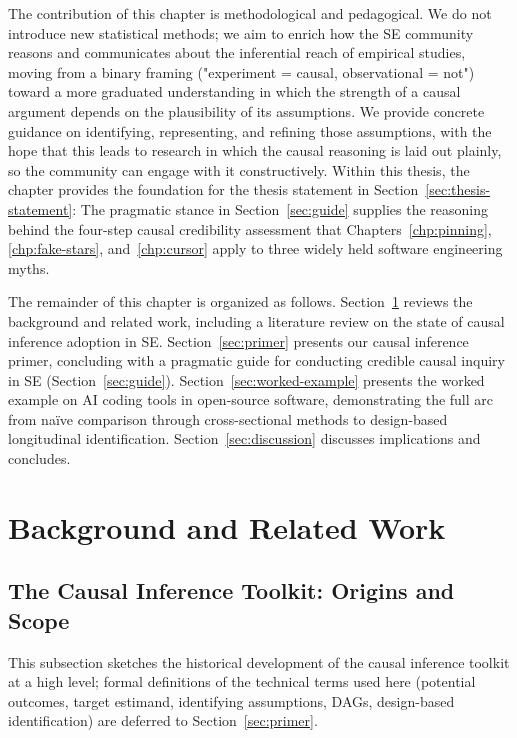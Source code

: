The contribution of this chapter is methodological and pedagogical. 
We do not introduce new statistical methods; we aim to enrich how the SE community reasons and communicates about the inferential reach of empirical studies, moving from a binary framing ("experiment = causal, observational = not") toward a more graduated understanding in which the strength of a causal argument depends on the plausibility of its assumptions. 
We provide concrete guidance on identifying, representing, and refining those assumptions, with the hope that this leads to research in which the causal reasoning is laid out plainly, so the community can engage with it constructively.
Within this thesis, the chapter provides the foundation for the thesis statement in Section~\ref{sec:thesis-statement}: The pragmatic stance in Section~\ref{sec:guide} supplies the reasoning behind the four-step causal credibility assessment that Chapters~\ref{chp:pinning}, \ref{chp:fake-stars}, and~\ref{chp:cursor} apply to three widely held software engineering myths.

The remainder of this chapter is organized as follows.
Section~\ref{sec:background} reviews the background and related work, including a literature review on the state of causal inference adoption in SE.
Section~\ref{sec:primer} presents our causal inference primer, concluding with a pragmatic guide for conducting credible causal inquiry in SE (Section~\ref{sec:guide}).
Section~\ref{sec:worked-example} presents the worked example on AI coding tools in open-source software, demonstrating the full arc from na\"ive comparison through cross-sectional methods to design-based longitudinal identification.
Section~\ref{sec:discussion} discusses implications and concludes.

\section{Background and Related Work}
\label{sec:background}

\subsection{The Causal Inference Toolkit: Origins and Scope}
\label{sec:bg-causal-history}

This subsection sketches the historical development of the causal inference toolkit at a high level; formal definitions of the technical terms used here (potential outcomes, target estimand, identifying assumptions, DAGs, design-based identification) are deferred to Section~\ref{sec:primer}.

